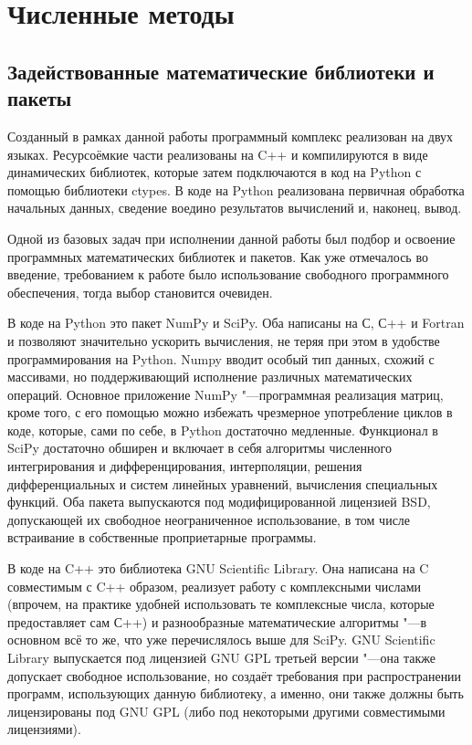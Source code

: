 \chapter{\textbf{Численные методы}}\label{ch:programming}
\section{\textbf{Задействованные математические библиотеки и пакеты}}\label{sec:programming/libraries}
Созданный в рамках данной работы программный комплекс реализован на двух языках. Ресурсоёмкие части реализованы на C++ и компилируются
в виде динамических библиотек, которые затем подключаются в код на Python с помощью библиотеки ctypes\cite{ctypes}. В коде на
Python реализована первичная обработка начальных данных, сведение воедино результатов вычислений и, наконец, вывод.

Одной из базовых задач при исполнении данной работы был подбор и освоение программных математических библиотек и
пакетов. Как уже отмечалось во введение, требованием к работе было использование свободного программного обеспечения,
тогда выбор становится очевиден.

В коде на Python это пакет NumPy\cite{harris2020array} и SciPy\cite{2020SciPy-NMeth}. Оба
написаны на С, С++ и Fortran и позволяют значительно ускорить вычисления, не теряя при этом в удобстве программирования
на Python. Numpy вводит особый тип данных, схожий с массивами, но поддерживающий исполнение различных математических операций.
Основное приложение NumPy "---программная реализация матриц, кроме того, с его помощью можно избежать чрезмерное употребление
циклов в коде, которые, сами по себе, в Python достаточно медленные. Функционал в SciPy достаточно обширен и включает в
себя алгоритмы численного интегрирования и дифференцирования, интерполяции, решения дифференциальных и систем линейных
уравнений, вычисления специальных функций. Оба пакета выпускаются под модифицированной лицензией
BSD\cite{numpy-license}\cite{scipy-license}, допускающей их свободное неограниченное использование, в том числе
встраивание в собственные проприетарные программы.

В коде на C++ это библиотека GNU Scientific Library\cite{galassi2018scientific}. Она написана на C совместимым с C++
образом, реализует работу с комплексными числами (впрочем, на практике удобней использовать те комплексные числа,
которые предоставляет сам С++) и разнообразные математические алгоритмы "---в основном всё то же, что уже перечислялось
выше для SciPy. GNU Scientific Library выпускается под лицензией GNU GPL третьей версии\cite{gsl-license} "---она
также допускает свободное использование, но создаёт требования при распространении программ, использующих данную
библиотеку, а именно, они также должны быть лицензированы под GNU GPL (либо под некоторыми другими совместимыми
лицензиями).

